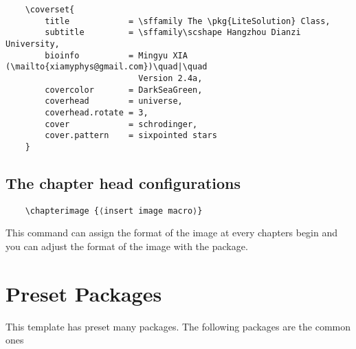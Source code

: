 \documentclass[mtpro2,twoside,openany]{litesolution}
\begin{document}
\begin{verbatim}
    \coverset{
        title            = \sffamily The \pkg{LiteSolution} Class,
        subtitle         = \sffamily\scshape Hangzhou Dianzi University,
        bioinfo          = Mingyu XIA (\mailto{xiamyphys@gmail.com})\quad|\quad
                           Version 2.4a,
        covercolor       = DarkSeaGreen,
        coverhead        = universe,
        coverhead.rotate = 3,
        cover            = schrodinger,
        cover.pattern    = sixpointed stars
    }
\end{verbatim}

\subsection{The chapter head configurations}

\begin{verbatim}
    \chapterimage {⟨insert image macro⟩}
\end{verbatim}

This command can assign the format of the image at every chapters begin and you can adjust the format of the image with the  package.

\section{Preset Packages}

This template has preset many packages. The following packages are the common ones
\end{document}
